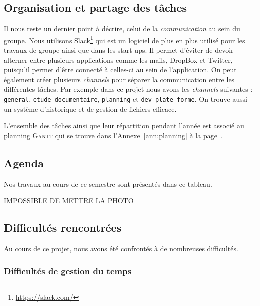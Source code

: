 \subsection{Organisation et partage des tâches}
Il nous reste un dernier point à décrire, celui de la \emph{communication}
au sein du groupe.
Nous utilisons Slack\footnote{\url{https://slack.com/}} qui est un logiciel
de plus en plus utilisé pour les travaux de groupe ainsi que dans les start-ups.
Il permet d'éviter de devoir alterner entre plusieurs applications comme les mails,
DropBox et Twitter, puisqu'il permet d'être connecté
à celles-ci au sein de l'application.
On peut également créer plusieurs \emph{channels} pour séparer la communication
entre les différentes tâches.
Par exemple dans ce projet nous avons les \emph{channels} suivantes :
\texttt{general}, \texttt{etude-documentaire}, 
\texttt{planning} et \texttt{dev\_plate-forme}.
On trouve aussi un système d'historique et de gestion de fichiers efficace.

L'ensemble des tâches ainsi que leur répartition pendant l'année
est associé au planning \textsc{Gantt} qui se trouve
dans l'Annexe~\ref{ann:planning} à la page~\pageref{ann:planning}.

\subsection{Agenda}

Nos travaux au cours de ce semestre sont présentés dans ce tableau.

IMPOSSIBLE DE METTRE LA PHOTO


\subsection{Difficultés rencontrées}

Au cours de ce projet, nous avons été confrontés à de nombreuses difficultés.

\subsubsection{Difficultés de gestion du temps}



